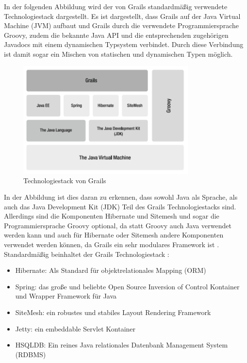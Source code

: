 In der folgenden Abbildung wird der von Grails standardmäßig verwendete Technologiestack dargestellt. Es ist dargestellt, dass Grails auf der Java Virtual Machine (JVM) aufbaut und Grails durch die verwendete Programmiersprache Groovy, zudem die bekannte Java API und die entsprechenden zugehörigen Javadocs mit einem dynamischen Typsystem verbindet. Durch diese Verbindung ist damit sogar ein Mischen von statischen und dynamischen Typen möglich. \autocite[S.2-4]{DGG2002} 
\begin{figure}[h]
\centering
\includegraphics[width=0.80\textwidth]{img/Grails-Stack.png}
\caption {Technologiestack von Grails \autocite[S.3]{DGG2002}}
\end{figure} 
In der Abbildung ist dies daran zu erkennen, dass sowohl Java als Sprache, als auch das Java Development Kit (JDK) Teil des Grails Technologiestacks sind. Allerdings sind die Komponenten Hibernate und Sitemesh und sogar die Programmiersprache Groovy optional, da statt Groovy auch Java verwendet werden kann und auch für Hibernate oder Sitemesh andere Komponenten verwendet werden können, da Grails ein sehr modulares Framework ist \autocite{GP2015}. Standardmäßig beinhaltet der Grails Technologiestack \autocite[S.2]{DGG2002}:
\begin{itemize}
\item Hibernate: Als Standard für objektrelationales Mapping (ORM)
\item Spring: das große und beliebte Open Source Inversion of Control Kontainer und Wrapper Framework für Java
\item SiteMesh: ein robustes und stabiles Layout Rendering Framework
\item Jetty: ein embeddable Servlet Kontainer
\item HSQLDB: Ein reines Java relationales Datenbank Management System (RDBMS) 
\end{itemize}